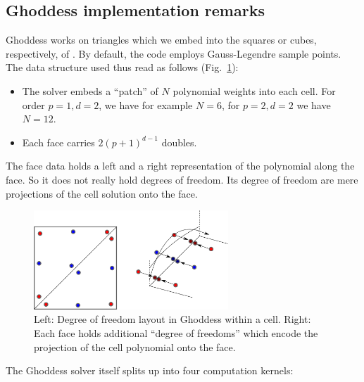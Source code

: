 \subsection{Ghoddess implementation remarks}

Ghoddess works on triangles which we embed into the squares or cubes,
respectively, of \ExaHyPE.
By default, the code employs Gauss-Legendre sample points.
The data structure used thus read as follows
(Fig.~\ref{figure:60_exahype:degree-of-freedom-layout:Ghoddess}):
\begin{itemize}
  \item The solver embeds a ``patch'' of $N$ polynomial weights into each cell.
  For order $p=1, d=2$, we have for example $N=6$, for $p=2, d=2$ we have
  $N=12$.
  \item Each face carries $2(p+1)^{d-1}$ doubles.
\end{itemize}


\noindent
The face data holds a left and a right representation of the polynomial along
the face.
So it does not really hold degrees of freedom.
Its degree of freedom are mere projections of the cell solution onto the face.



\begin{figure}
 \begin{center}
  \includegraphics[width=0.65\textwidth]{60_exahype/Ghoddess-dof-layout.pdf}
 \end{center}
 \caption{
  Left: Degree of freedom layout in Ghoddess within a cell.
  Right: Each face holds additional ``degree of freedoms'' which encode the
  projection of the cell polynomial onto the face.
  \label{figure:60_exahype:degree-of-freedom-layout:Ghoddess}
 }
\end{figure}

The Ghoddess solver itself splits up into four computation kernels:

